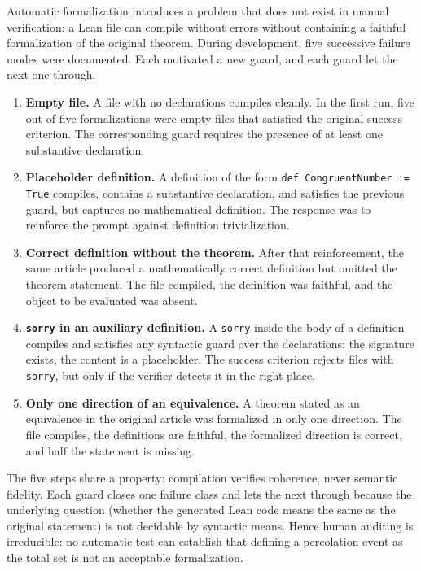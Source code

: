 \documentclass{article}
\theoremstyle{remark}
\begin{document}
Automatic formalization introduces a problem that does not exist in manual verification: a Lean file can compile without errors without containing a faithful formalization of the original theorem. During development, five successive failure modes were documented. Each motivated a new guard, and each guard let the next one through.

\begin{enumerate}
\item \textbf{Empty file.} A file with no declarations compiles cleanly. In the first run, five out of five formalizations were empty files that satisfied the original success criterion. The corresponding guard requires the presence of at least one substantive declaration.

\item \textbf{Placeholder definition.} A definition of the form \texttt{def CongruentNumber := True} compiles, contains a substantive declaration, and satisfies the previous guard, but captures no mathematical definition. The response was to reinforce the prompt against definition trivialization.

\item \textbf{Correct definition without the theorem.} After that reinforcement, the same article produced a mathematically correct definition but omitted the theorem statement. The file compiled, the definition was faithful, and the object to be evaluated was absent.

\item \textbf{\texttt{sorry} in an auxiliary definition.} A \texttt{sorry} inside the body of a definition compiles and satisfies any syntactic guard over the declarations: the signature exists, the content is a placeholder. The success criterion rejects files with \texttt{sorry}, but only if the verifier detects it in the right place.

\item \textbf{Only one direction of an equivalence.} A theorem stated as an equivalence in the original article was formalized in only one direction. The file compiles, the definitions are faithful, the formalized direction is correct, and half the statement is missing.
\end{enumerate}

The five steps share a property: compilation verifies coherence, never semantic fidelity. Each guard closes one failure class and lets the next through because the underlying question (whether the generated Lean code means the same as the original statement) is not decidable by syntactic means. Hence human auditing is irreducible: no automatic test can establish that defining a percolation event as the total set is not an acceptable formalization.
\end{document}
